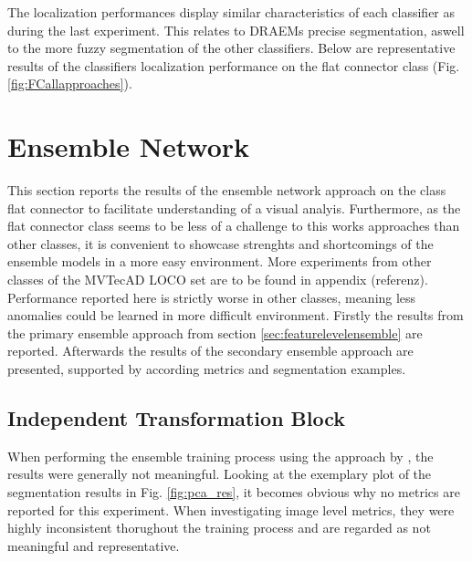 The localization performances display similar characteristics of each classifier as during the last experiment. This relates to DRAEMs \cite{Zavrtanik_2021DRAEM} precise segmentation, 
aswell to the more fuzzy segmentation of the other classifiers. Below are representative results of the classifiers localization performance on the flat connector class (Fig. \ref{fig:FCallapproaches}).






\section{Ensemble Network}
\label{sec:ensembleresults}

This section reports the results of the ensemble network approach on the class flat connector to facilitate understanding of a visual 
analyis. Furthermore, as the flat connector class seems to be less of a challenge to this works approaches than other classes, it is convenient to showcase strenghts and 
shortcomings of the ensemble models in a more easy environment. More experiments from other classes of the MVTecAD LOCO \cite{LOCODentsAndScratchesBergmann2022} set are to be found in appendix (referenz). 
Performance reported here is strictly worse in other classes, meaning less anomalies could be learned in more difficult environment. Firstly the results from the primary ensemble approach from section \ref{sec:featurelevelensemble} are reported. Afterwards 
the results of the secondary ensemble approach are presented, supported by according metrics and segmentation examples.


\subsection{Independent Transformation Block}
\label{subsec:ITBfail}

When performing the ensemble training process using the approach by \cite{EnsembleHeller2023}, the results were generally not meaningful. Looking at the exemplary plot of the segmentation 
results in Fig. \ref{fig:pca_res}, it becomes obvious why no metrics are reported for this experiment. When investigating image level metrics, they were highly inconsistent thorughout 
the training process and are regarded as not meaningful and representative.



